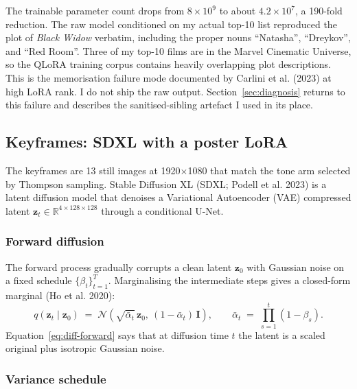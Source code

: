 \documentclass{article}
\begin{document}
The trainable parameter count drops from $8 \times 10^9$ to about $4.2 \times 10^7$, a 190-fold reduction. The raw model conditioned on my actual top-10 list reproduced the plot of \emph{Black Widow} verbatim, including the proper nouns ``Natasha'', ``Dreykov'', and ``Red Room''. Three of my top-10 films are in the Marvel Cinematic Universe, so the QLoRA training corpus contains heavily overlapping plot descriptions. This is the memorisation failure mode documented by Carlini et al. (2023) at high LoRA rank. I do not ship the raw output. Section~\ref{sec:diagnosis} returns to this failure and describes the sanitised-sibling artefact I used in its place.

\subsection{Keyframes: SDXL with a poster LoRA}

The keyframes are 13 still images at 1920$\times$1080 that match the tone arm selected by Thompson sampling. Stable Diffusion XL (SDXL; Podell et al. 2023) is a latent diffusion model that denoises a Variational Autoencoder (VAE) compressed latent $\mathbf{z}_t \in \mathbb{R}^{4 \times 128 \times 128}$ through a conditional U-Net.

\subsubsection*{Forward diffusion}

The forward process gradually corrupts a clean latent $\mathbf{z}_0$ with Gaussian noise on a fixed schedule $\{\beta_t\}_{t=1}^T$. Marginalising the intermediate steps gives a closed-form marginal (Ho et al. 2020):
\begin{equation}
q(\mathbf{z}_t \mid \mathbf{z}_0) \;=\; \mathcal{N}\!\left(\sqrt{\bar\alpha_t}\,\mathbf{z}_0,\ (1 - \bar\alpha_t)\,\mathbf{I}\right), \qquad \bar\alpha_t \;=\; \prod_{s=1}^{t}(1 - \beta_s).
\label{eq:diff-forward}
\end{equation}
Equation~\ref{eq:diff-forward} says that at diffusion time $t$ the latent is a scaled original plus isotropic Gaussian noise.

\subsubsection*{Variance schedule}
\end{document}
